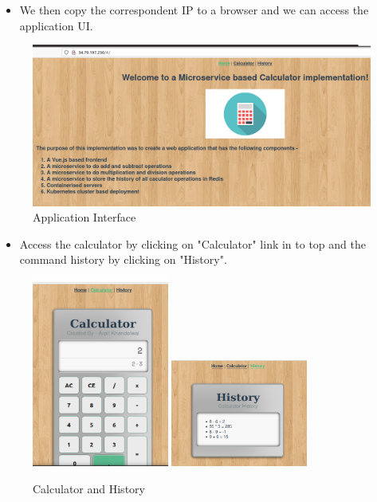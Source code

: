 \documentclass[12pt,a4paper,oneside]{report}
\begin{document}
\begin{itemize}
    \item We then copy the correspondent \ac{IP} to a browser and we can access the application UI.
\end{itemize}

\begin{figure}[H]
\centering
\includegraphics[width=1.0\textwidth]{./pictures/ingresslink.png}
\caption{Application Interface}
\label{fig:Application Interface}
\end{figure}

\begin{itemize}
    \item Access the calculator by clicking on "Calculator" link in to top and the command history by clicking on "History".
\end{itemize}
\begin{figure}[H]
\centering
    \centering
    {\includegraphics[width=0.4\textwidth]{./pictures/calc.png}}
    {\includegraphics[width=0.4\textwidth]{./pictures/boot.png}}
\caption{Calculator and History}
\label{fig:Service/Bootstorage}
\end{figure}
\end{document}
